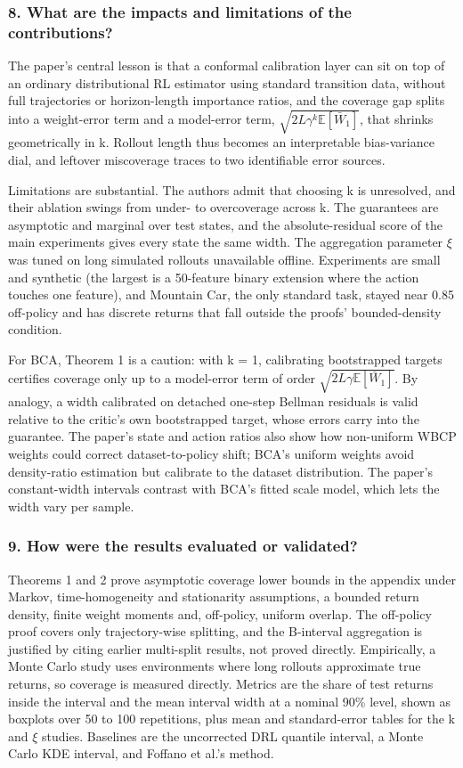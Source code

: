 \documentclass[11pt]{article}
\newcommand{\question}[1]{\subsubsection*{#1}}
\begin{document}
\question{8. What are the impacts and limitations of the contributions?}

The paper's central lesson is that a conformal calibration layer can sit on top of an ordinary distributional RL estimator using standard transition data, without full trajectories or horizon-length importance ratios, and the coverage gap splits into a weight-error term and a model-error term, $\sqrt{2L\gamma^k \mathbb{E}[\bar{W}_1]}$, that shrinks geometrically in k. Rollout length thus becomes an interpretable bias-variance dial, and leftover miscoverage traces to two identifiable error sources.

Limitations are substantial. The authors admit that choosing k is unresolved, and their ablation swings from under- to overcoverage across k. The guarantees are asymptotic and marginal over test states, and the absolute-residual score of the main experiments gives every state the same width. The aggregation parameter \ensuremath{\xi} was tuned on long simulated rollouts unavailable offline. Experiments are small and synthetic (the largest is a 50-feature binary extension where the action touches one feature), and Mountain Car, the only standard task, stayed near 0.85 off-policy and has discrete returns that fall outside the proofs' bounded-density condition.

For BCA, Theorem 1 is a caution: with k = 1, calibrating bootstrapped targets certifies coverage only up to a model-error term of order $\sqrt{2L\gamma \mathbb{E}[\bar{W}_1]}$. By analogy, a width calibrated on detached one-step Bellman residuals is valid relative to the critic's own bootstrapped target, whose errors carry into the guarantee. The paper's state and action ratios also show how non-uniform WBCP weights could correct dataset-to-policy shift; BCA's uniform weights avoid density-ratio estimation but calibrate to the dataset distribution. The paper's constant-width intervals contrast with BCA's fitted scale model, which lets the width vary per sample.

\question{9. How were the results evaluated or validated?}

Theorems 1 and 2 prove asymptotic coverage lower bounds in the appendix under Markov, time-homogeneity and stationarity assumptions, a bounded return density, finite weight moments and, off-policy, uniform overlap. The off-policy proof covers only trajectory-wise splitting, and the B-interval aggregation is justified by citing earlier multi-split results, not proved directly. Empirically, a Monte Carlo study uses environments where long rollouts approximate true returns, so coverage is measured directly. Metrics are the share of test returns inside the interval and the mean interval width at a nominal 90\% level, shown as boxplots over 50 to 100 repetitions, plus mean and standard-error tables for the k and \ensuremath{\xi} studies. Baselines are the uncorrected DRL quantile interval, a Monte Carlo KDE interval, and Foffano et al.'s method.
\end{document}
